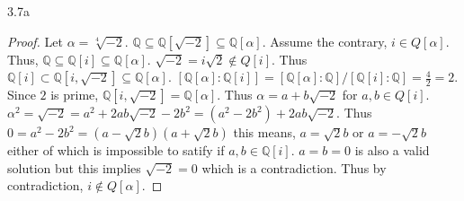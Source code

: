 \documentclass{article}
\newcommand{\Q}{\mathbb{Q}}
\begin{document}
\begin{PROB}{3.7a}\label{Problem 3.7a.}
\end{PROB}
\begin{proof}
    Let $\alpha = \sqrt[4]{-2}$. 
    $\Q \subseteq \Q[\sqrt{-2}] \subseteq \Q[\alpha]$. 
    Assume the contrary, $i \in Q[\alpha]$. Thus, $\Q \subseteq \Q[i] \subseteq \Q[\alpha]$. $\sqrt{-2} = i\sqrt{2} \not \in Q[i]$. Thus $\Q[i] \subset \Q[i, \sqrt{-2}] \subseteq \Q[\alpha]$. $[\Q[\alpha] : \Q[i]] = [\Q[\alpha] : \Q]/[\Q[i] : \Q] = \frac{4}{2} = 2$. Since $2$ is prime, $\Q[i, \sqrt{-2}] = \Q[\alpha]$. Thus $\alpha = a + b\sqrt{-2}$ for $a, b \in Q[i]$. $\alpha^2 = \sqrt{-2} = a^2 + 2ab\sqrt{-2} - 2b^2 = (a^2 - 2b^2) + 2ab\sqrt{-2}$. Thus $0 = a^2 - 2b^2 =  (a - \sqrt{2}b)(a + \sqrt{2}b)$ this means, $a = \sqrt{2}b$ or $a = -\sqrt{2}b$ either of which is impossible to satify if $a, b \in \Q[i]$. $a = b =0$ is also a valid solution but this implies $\sqrt{-2} = 0$ which is a contradiction. Thus by contradiction, $i \not \in Q[\alpha]$.                  
\end{proof}
\end{document}
